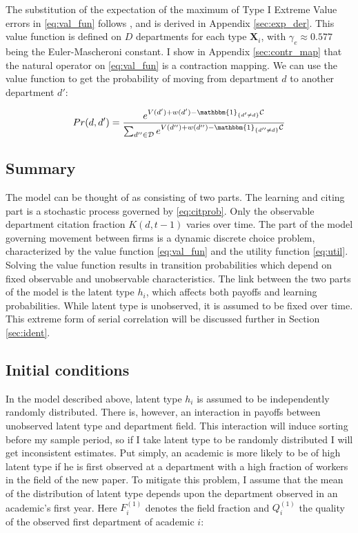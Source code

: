 The substitution of the expectation of the maximum of Type I Extreme Value errors
in \eqref{eq:val_fun} follows \citet{rust1987optimal}, and is derived in Appendix \ref{sec:exp_der}. This value function
 is defined on $D$ departments for each type $\mathbf{X}_i$, with $\gamma_e \approx 0.577$ being the Euler-Mascheroni constant. I
show in Appendix \ref{sec:contr_map} that the natural operator on \eqref{eq:val_fun} is a
contraction mapping. We can use the value function to get the
probability of moving from department $d$ to another department $d'$:

\begin{equation}
    Pr(d,d') = \frac{e^{V(d') + w(d') - \mathbbm{1}_{\{d'\neq d\}}\mathcal{C}}}{\sum_{d'' \in \mathcal{D}} e^{V(d'') + w(d'') - \mathbbm{1}_{\{d''\neq d\}} \mathcal{C}}}
    \label{eq:trans}
\end{equation}

\subsection{Summary} 

The model can be thought of as consisting of two parts.  The learning and citing part is 
a stochastic process governed by \eqref{eq:citprob}.  Only the observable department 
citation fraction $K(d,t-1)$ varies over time.\footnotemark{}
The part of the model governing movement between firms is a dynamic discrete
choice problem, characterized by the value
function \eqref{eq:val_fun} and the utility function \eqref{eq:util}.
 Solving the value function results in transition probabilities
 which depend on fixed observable and unobservable characteristics.  The link between the two parts
 of the model is the latent type $h_i$, which affects both
payoffs and learning probabilities.  While latent type is unobserved, it is assumed
to be fixed over time.  This extreme form of serial correlation
 will be discussed further in Section \ref{sec:ident}.

\subsection{Initial conditions}
\label{sec:init_cond}

In the model described above, latent type $h_i$ is assumed to be
independently randomly distributed. There is, however, an interaction in
payoffs between unobserved latent type and department field.
This interaction will induce sorting before my sample period, so if I
take latent type to be randomly distributed I will get inconsistent
estimates. Put simply, an academic is more likely to be of high latent type if he is
first observed at a department with a high fraction of workers in the field of
the new paper. To mitigate this
problem, I assume that the mean of the distribution of latent
type depends upon the department observed in an academic's first year.  Here $F^{(1)}_i$ denotes the 
field fraction and $Q^{(1)}_i$ the quality of the observed first department of academic $i$:

